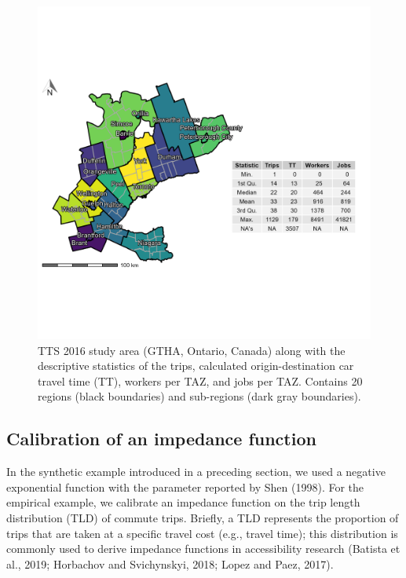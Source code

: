 \documentclass[]{elsarticle} %
\begin{document}
\begin{figure}

{\centering \includegraphics[width=0.8\linewidth]{images/TTS16-survey-area} 

}

\caption{\label{fig:TTS-16-survey-area}TTS 2016 study area (GTHA, Ontario, Canada) along with the descriptive statistics of the trips, calculated origin-destination car travel time (TT), workers per TAZ, and jobs per TAZ. Contains 20 regions (black boundaries) and sub-regions (dark gray boundaries).}\label{fig:TTS-16-survey-area}
\end{figure}

\hypertarget{calibration-of-an-impedance-function}{%
\subsection{Calibration of an impedance
function}\label{calibration-of-an-impedance-function}}

In the synthetic example introduced in a preceding section, we used a
negative exponential function with the parameter reported by Shen
(1998). For the empirical example, we calibrate an impedance function on
the trip length distribution (TLD) of commute trips. Briefly, a TLD
represents the proportion of trips that are taken at a specific travel
cost (e.g., travel time); this distribution is commonly used to derive
impedance functions in accessibility research (Batista et al., 2019;
Horbachov and Svichynskyi, 2018; Lopez and Paez, 2017).
\end{document}
